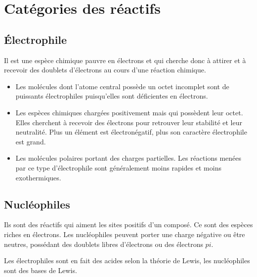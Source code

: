 \section{Catégories des réactifs}

\subsection{\'Electrophile}
Il est une espèce chimique pauvre en électrons et qui cherche donc à attirer et à recevoir des doublets d'électrons au cours d'une réaction chimique.
\begin{itemize}
  \item Les molécules dont l'atome central possède un octet incomplet sont de puissants électrophiles puisqu'elles sont déficientes en électrons.
  \item Les espèces chimiques chargées positivement mais qui possèdent leur octet.
    Elles cherchent à recevoir des électrons pour retrouver leur stabilité et leur neutralité.
    Plus un élément est électronégatif, plus son caractère électrophile est grand.
  \item Les molécules polaires portant des charges partielles.
    Les réactions menées par ce type d'électrophile sont généralement moins rapides et moins exothermiques.

\end{itemize}

\subsection{Nucléophiles}
Ils sont des réactifs qui aiment les sites positifs d'un composé.
Ce sont des espèces riches en électrons.
Les nucléophiles peuvent porter une charge négative ou être neutres, possédant des doublets libres d'électrons ou des électrons $pi$.

Les électrophiles sont en fait des acides selon la théorie de Lewis, les nucléophiles sont des bases de Lewis.

